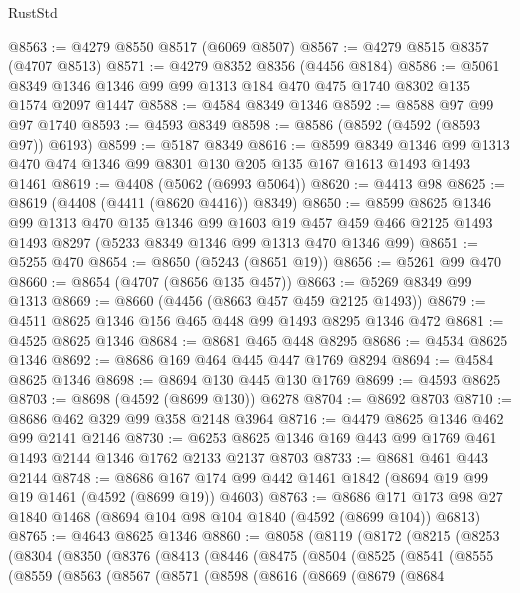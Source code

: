 \begin{lexlean}{RustStd}
\begin{coremodule}
@8563 := @4279 @8550 @8517 (@6069 @8507)
@8567 := @4279 @8515 @8357 (@4707 @8513)
@8571 := @4279 @8352 @8356 (@4456 @8184)
@8586 := @5061 @8349 @1346 @1346 @99 @99 @1313 @184 @470 @475 @1740 @8302 @135 @1574 @2097 @1447
@8588 := @4584 @8349 @1346
@8592 := @8588 @97 @99 @97 @1740
@8593 := @4593 @8349
@8598 := @8586 (@8592 (@4592 (@8593 @97)) @6193)
@8599 := @5187 @8349
@8616 := @8599
    @8349
    @1346
    @99
    @1313
    @470
    @474
    @1346
    @99
    @8301
    @130
    @205
    @135
    @167
    @1613
    @1493
    @1493
    @1461
@8619 := @4408 (@5062 (@6993 @5064))
@8620 := @4413 @98
@8625 := @8619 (@4408 (@4411 (@8620 @4416)) @8349)
@8650 := @8599
    @8625
    @1346
    @99
    @1313
    @470
    @135
    @1346
    @99
    @1603
    @19
    @457
    @459
    @466
    @2125
    @1493
    @1493
    @8297
    (@5233 @8349 @1346 @99 @1313 @470 @1346 @99)
@8651 := @5255 @470
@8654 := @8650 (@5243 (@8651 @19))
@8656 := @5261 @99 @470
@8660 := @8654 (@4707 (@8656 @135 @457))
@8663 := @5269 @8349 @99 @1313
@8669 := @8660 (@4456 (@8663 @457 @459 @2125 @1493))
@8679 := @4511 @8625 @1346 @156 @465 @448 @99 @1493 @8295 @1346 @472
@8681 := @4525 @8625 @1346
@8684 := @8681 @465 @448 @8295
@8686 := @4534 @8625 @1346
@8692 := @8686 @169 @464 @445 @447 @1769 @8294
@8694 := @4584 @8625 @1346
@8698 := @8694 @130 @445 @130 @1769
@8699 := @4593 @8625
@8703 := @8698 (@4592 (@8699 @130)) @6278
@8704 := @8692 @8703
@8710 := @8686 @462 @329 @99 @358 @2148 @3964
@8716 := @4479 @8625 @1346 @462 @99 @2141 @2146
@8730 := @6253 @8625 @1346 @169 @443 @99 @1769 @461 @1493 @2144 @1346 @1762 @2133 @2137 @8703
@8733 := @8681 @461 @443 @2144
@8748 := @8686 @167 @174 @99 @442 @1461 @1842 (@8694 @19 @99 @19 @1461 (@4592 (@8699 @19)) @4603)
@8763 := @8686 @171 @173 @98 @27 @1840 @1468 (@8694 @104 @98 @104 @1840 (@4592 (@8699 @104)) @6813)
@8765 := @4643 @8625 @1346
@8860 := @8058
    (@8119
      (@8172
        (@8215
          (@8253
            (@8304
              (@8350
                (@8376
                  (@8413
                    (@8446
                      (@8475
                        (@8504
                          (@8525
                            (@8541
                              (@8555
                                (@8559
                                  (@8563
                                    (@8567
                                      (@8571
                                        (@8598
                                          (@8616
                                            (@8669
                                              (@8679
                                                (@8684

\end{coremodule}
\end{lexlean}
